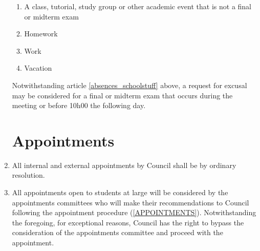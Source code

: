 \documentclass[oneside]{book}
\begin{document}
\begin{enumerate}
\begin{enumerate}
\item\label{absences_schoolstuff} A class, tutorial, study group or other academic event that is not a final or midterm exam
\item Homework 
\item Work 
\item Vacation 
\end{enumerate}
Notwithstanding article \ref{absences_schoolstuff} above, a request for excusal may be considered
for a final or midterm exam that occurs during the meeting or before 10h00 the following day.

\chapter{\label{Appointments}Appointments }
\item All internal and external appointments by Council shall be by ordinary
resolution. 
\item All appointments open to students at large will be considered by the
appointments committees who will make their recommendations to Council
following the appointment procedure (\autoref{APPOINTMENTS}). Notwithstanding the
foregoing, for exceptional reasons, Council has the right to bypass
the consideration of the appointments committee and proceed with the
appointment. 


\end{enumerate}
\end{document}
